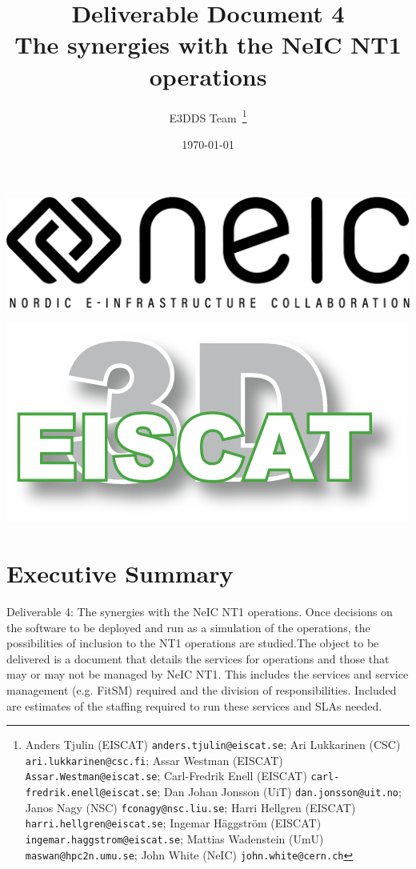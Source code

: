\documentclass[12pt,a4paper]{article}
\title{
{\bf Deliverable Document 4} \\
The synergies with the NeIC NT1 operations}
\author{E3DDS Team~\footnote{
Anders Tjulin (EISCAT) {\tt anders.tjulin@eiscat.se};
Ari Lukkarinen (CSC) {\tt ari.lukkarinen@csc.fi};
Assar Westman (EISCAT) {\tt Assar.Westman@eiscat.se};
Carl-Fredrik Enell (EISCAT) {\tt carl-fredrik.enell@eiscat.se};
Dan Johan Jonsson (UiT) {\tt dan.jonsson@uit.no};
Janos Nagy (NSC) {\tt fconagy@nsc.liu.se};
Harri Hellgren (EISCAT) {\tt harri.hellgren@eiscat.se};
Ingemar H\"{a}ggstr\"{o}m (EISCAT) {\tt ingemar.haggstrom@eiscat.se};
Mattias Wadenstein (UmU) {\tt maswan@hpc2n.umu.se};
John White (NeIC) {\tt john.white@cern.ch}}}
\date{\today}
\begin{document}
\pagestyle{fancy}

\maketitle
\par\noindent
\begin{minipage}{0.5\textwidth}
  \includegraphics[scale=0.18]{NEIC_logo_screen_black.pdf}
\end{minipage}
\begin{minipage}{0.5\textwidth}
  \hfill
  \includegraphics[width=0.75\linewidth]{e3d-logo-green-500px}
\end{minipage}

\newpage
\tableofcontents
\newpage

\section{Executive Summary}
\label{exec-summ}


Deliverable 4: The synergies with the NeIC NT1 operations. Once decisions on the software to be deployed and run as a simulation of the \ED operations, the possibilities of inclusion to the NT1 operations are studied.The object to be delivered is a document that details the services for \ED operations and those that may or may not be managed by NeIC NT1. This includes the services and service management (e.g. FitSM) required and the division of responsibilities.  Included are estimates of the staffing required to run these services and SLAs needed. 
\end{document}
